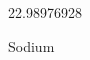 \documentclass[12pt]{article}
\begin{document}
\hfill{}
\vfill
\begin{center}
  {\fontsize{50}{60}
  }

  \vspace{1em}

  22.98976928

Sodium
\end{center}
\vfill
\end{document}
